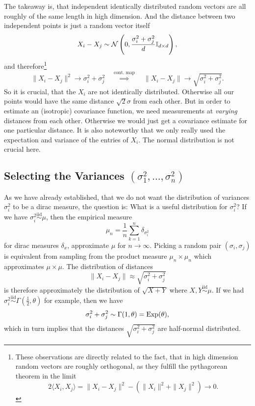 The takeaway is, that independent identically distributed random vectors are
all roughly of the same length in high dimension. And the distance between
two independent points is just a random vector itself
\[
	X_i-X_j\sim\mathcal{N}\left(
		0,\frac{\sigma_i^2+\sigma_j^2}{d}\mathbb{I}_{d\times d}
	\right),
\]
and therefore\footnote{
	These observations are directly related to the fact, that in high dimension
	random vectors are roughly orthogonal, as they fulfill the pythagorean
	theorem in the limit
	\[
		2\langle X_i, X_j\rangle = \|X_i-X_j\|^2 - (\|X_i\|^2 + \|X_j\|^2) \to 0.
	\]
}
\[
	\|X_i- X_j\|^2 \to \sigma_i^2 + \sigma_j^2
	\quad\overset{\text{cont. map}}\implies \quad
	\|X_i-X_j\|\to\sqrt{\sigma_i^2+\sigma_j^2}.
\]
So it is crucial, that the \(X_i\) are not identically distributed. Otherwise
all our points would have the same distance \(\sqrt{2}\sigma\) from each other. But
in order to estimate an (isotropic) covariance function,
we need measurements at \emph{varying} distances from each other. Otherwise we would
just get a covariance estimate for one particular distance. It is also noteworthy
that we only really used the expectation and variance of the entries of \(X_i\).
The normal distribution is not crucial here.

\subsection{Selecting the Variances \texorpdfstring{\((\sigma_1^2,\dots,\sigma_n^2)\)}{(σ₁²,...,σₙ²)}}

As we have already established, that we do not want the distribution of
variances \(\sigma_i^2\) to be a dirac measure, the question is: What is a
useful distribution for \(\sigma_i^2\)? If we have
\(\sigma_i^2\overset{\text{iid}}\sim\mu\), then the empirical measure
\[
	\mu_n = \frac1n\sum_{k=1}^n \delta_{\sigma_i^2}
\]
for dirac measures \(\delta_x\), approximate \(\mu\) for \(n\to\infty\). Picking
a random pair \((\sigma_i,\sigma_j)\) is equivalent from sampling from the
product measure \(\mu_n \times \mu_n\) which approximates \(\mu\times\mu\).
The distribution of distances
\[
	\|X_i-X_j\| \approx \sqrt{\sigma_i^2 + \sigma_j^2}
\]
is therefore approximately the distribution of \(\sqrt{X+Y}\) where
\(X,Y\overset{\text{iid}}\sim\mu\). If we had
\(\sigma_i^2\overset{\text{iid}}{\sim}\Gamma(\tfrac12,\theta)\) for example,
then we have
\[
	\sigma_i^2 + \sigma_j^2 \sim \Gamma(1,\theta) = \operatorname{Exp}(\theta),
\]
which in turn implies that the distances \(\sqrt{\sigma_i^2 + \sigma_j^2}\)
are half-normal distributed.

